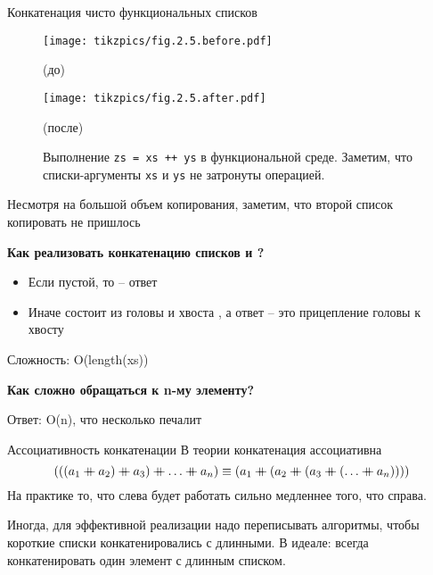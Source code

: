 \begin{frame}{Конкатенация чисто функциональных списков}
\begin{figure}[h]
	\centering
  \texttt{[image: tikzpics/fig.2.5.before.pdf]}\par
	(до)\par
	\vspace{0.5cm}
  \texttt{[image: tikzpics/fig.2.5.after.pdf]}\par
	(после)\par
	\vspace{0.5cm}
	\caption{Выполнение \texttt{zs = xs ++ ys} в функциональной среде. Заметим, что списки-аргументы \texttt{xs} и \texttt{ys} не затронуты операцией.
	}
	\label{fig:2.5}
\end{figure}
Несмотря на большой объем копирования, заметим, что второй список копировать не пришлось
\end{frame}


\begin{frame}{}
\textbf{Как реализовать конкатенацию  \mlinline{++} списков  и ?}
\begin{itemize}
\item Если  пустой, то  -- ответ
\item Иначе  состоит из головы  и хвоста , а ответ -- это прицепление головы  к хвосту  
\end{itemize}
Сложность: O(length(xs))
\vspace{2em}

\textbf{Как сложно обращаться к n-му элементу?}

Ответ: O(n), что несколько печалит

\end{frame}

\begin{frame}{Ассоциативность конкатенации}
В теории конкатенация ассоциативна
\[
  (((a_1 \mdoubleplus a_2) \mdoubleplus a_3) \mdoubleplus\dots \mdoubleplus a_n) \equiv 
  (a_1 \mdoubleplus (a_2 \mdoubleplus (a_3 \mdoubleplus (\dots \mdoubleplus a_n))))
\]
На практике то, что слева будет работать сильно медленнее того, что справа.

\begin{hint}
Иногда, для эффективной реализации надо переписывать алгоритмы, чтобы короткие списки конкатенировались с длинными. В идеале: всегда конкатенировать один элемент с длинным списком.
\end{hint}
\end{frame}



